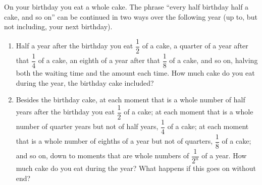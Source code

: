 On your birthday you eat a whole cake. The phrase ``every half birthday half a cake, and so on'' can be continued in two ways over the following year (up to, but not including, your next birthday).
\begin{enumerate}
\item[(a)] Half a year after the birthday you eat $\dfrac{1}{2}$ of a cake, a quarter of a year after that $\dfrac{1}{4}$ of a cake, an eighth of a year after that $\dfrac{1}{8}$ of a cake, and so on, halving both the waiting time and the amount each time. How much cake do you eat during the year, the birthday cake included?
\item[(b)] Besides the birthday cake, at each moment that is a whole number of half years after the birthday you eat $\dfrac{1}{2}$ of a cake; at each moment that is a whole number of quarter years but not of half years, $\dfrac{1}{4}$ of a cake; at each moment that is a whole number of eighths of a year but not of quarters, $\dfrac{1}{8}$ of a cake; and so on, down to moments that are whole numbers of $\dfrac{1}{2^n}$ of a year. How much cake do you eat during the year? What happens if this goes on without end?
\end{enumerate}
